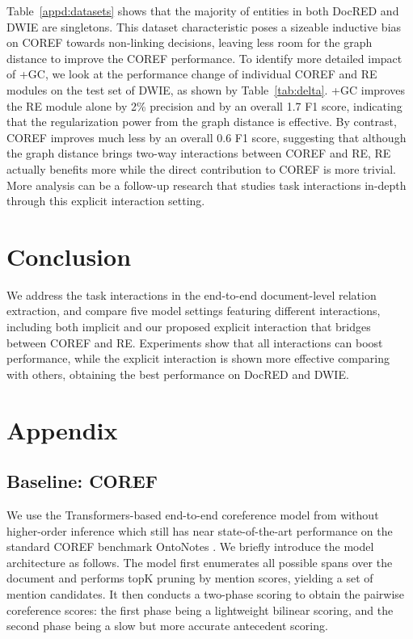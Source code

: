\documentclass[11pt]{article}
\begin{document}
Table~\ref{appd:datasets} shows that the majority of entities in both DocRED and DWIE are singletons. This dataset characteristic poses a sizeable inductive bias on COREF towards non-linking decisions, leaving less room for the graph distance  to improve the COREF performance.
To identify more detailed impact of +GC, we look at the performance change of individual COREF and RE modules on the test set of DWIE, as shown by Table~\ref{tab:delta}.
+GC improves the RE module alone by 2\% precision and by an overall 1.7 F1 score, indicating that the regularization power from the graph distance is effective. By contrast, COREF improves much less by an overall 0.6 F1 score, suggesting that although the graph distance brings two-way interactions between COREF and RE, RE actually benefits more while the direct contribution to COREF is more trivial. More analysis can be a follow-up research that studies task interactions in-depth through this explicit interaction setting.
 \section{Conclusion}
\label{sec:conclusion}

We address the task interactions in the end-to-end document-level relation extraction, and compare five model settings featuring different interactions, including both implicit and our proposed explicit interaction that bridges between COREF and RE. Experiments show that all interactions can boost performance, while the explicit interaction is shown more effective comparing with others, obtaining the best performance on DocRED and DWIE.
 



\clearpage
\appendix
\section{Appendix}
\label{sec:appendix}

\subsection{Baseline: COREF}
\label{appd:baseline}

We use the Transformers-based end-to-end coreference model from \citet{lee-etal-2018-higher,joshi-etal-2019-bert} without higher-order inference \citep{xu-choi-2020-revealing} which still has near state-of-the-art performance on the standard COREF benchmark OntoNotes \citep{ontonotes}. We briefly introduce the model architecture as follows. The model first enumerates all possible spans over the document and performs topK pruning by mention scores, yielding a set of mention candidates. It then conducts a two-phase scoring to obtain the pairwise coreference scores: the first phase being a lightweight bilinear scoring, and the second phase being a slow but more accurate antecedent scoring.
\end{document}
